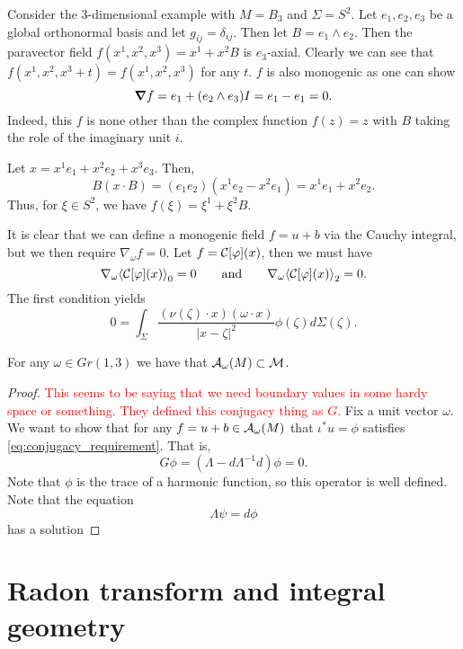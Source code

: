 \documentclass[12pt]{article}
\begin{document}
\begin{example}
    Consider the 3-dimensional example with $M=B_3$ and $\Sigma=S^2$.  Let $e_1,e_2,e_3$ be a global orthonormal basis and let $g_{ij}=\delta_{ij}$.  Then let $B=e_1 \wedge e_2$.  Then the paravector field $f(x^1,x^2,x^3)=x^1+x^2B$ is $e_3$-axial. Clearly we can see that $f(x^1,x^2,x^3+t)=f(x^1,x^2,x^3)$ for any $t$.  $f$ is also monogenic as one can show
    \[
        \boldsymbol{\nabla} f = e_1 + (e_2 \wedge e_3)I = e_1 - e_1 = 0.
    \]
    Indeed, this $f$ is none other than the complex function $f(z)=z$ with $B$ taking the role of the imaginary unit $i$. 

    Let $x=x^1e_1 + x^2e_2 + x^3e_3$.  Then, 
    \[
        B (x\cdot B) = (e_1e_2)( x^1e_2 -x^2 e_1 ) = x^1 e_1 + x^2 e_2.
    \] 
    Thus, for $\xi \in S^2$, we have $f(\xi)=\xi^1 +\xi^2 B$.
\end{example}


It is clear that we can define a monogenic field $f=u+b$ via the Cauchy integral, but we then require $\nabla_\omega f = 0$.  Let $f=\mathcal{C}[\varphi](x)$, then we must have
\[
\nabla_\omega \proj{0}{\cauchy[\varphi](x)} = 0 \qquad \textrm{and} \qquad \nabla_\omega \proj{2}{\cauchy[\varphi](x)}=0.
\]
The first condition yields
\[
0 = \int_\Sigma \frac{(\nu(\zeta)\cdot x) (\omega \cdot x)}{|x-\zeta|^2} \phi(\zeta) d\Sigma(\zeta).
\]


\begin{theorem}
    For any $\omega \in Gr(1,3)$ we have that $\mathcal{A}_{\omega}(M)\subset \mathcal{M}$. 
\end{theorem}
\begin{proof}
    \textcolor{red}{This seems to be saying that we need boundary values in some hardy space or something. They defined this conjugacy thing as $G$.}
    Fix a unit vector $\omega$.  We want to show that for any $f=u+b\in \mathcal{A}_{\omega}(M)$ that $\iota^* u=\phi$ satisfies \ref{eq:conjugacy_requirement}.  That is,
    \[
        G\phi = (\Lambda - d\Lambda^{-1}d) \phi = 0.
    \]
    Note that $\phi$ is the trace of a harmonic function, so this operator is well defined.  Note that the equation
    \[
        \Lambda \psi = d \phi
    \]
    has a solution
\end{proof}

\section{Radon transform and integral geometry}
\end{document}
